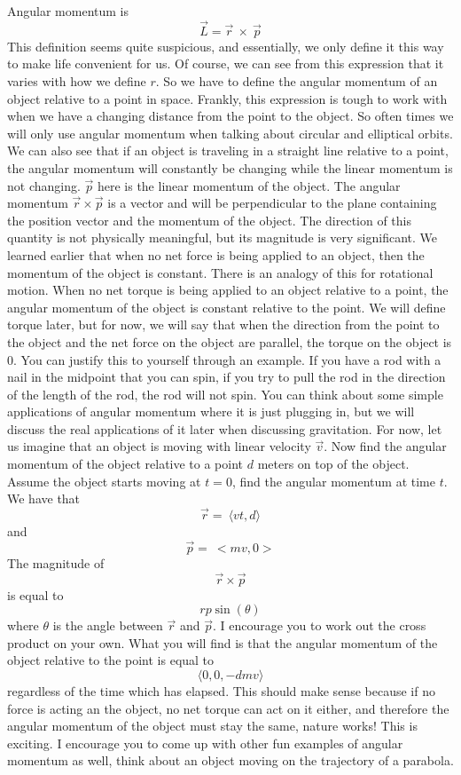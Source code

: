Angular momentum is \begin{equation}\vec{L} = \vec{r} \ \times \ \vec{p}\end{equation} This definition seems quite suspicious, and essentially, we only define it this way to make life convenient for us. Of course, we can see from this expression that it varies with how we define $r$. So we have to define the angular momentum of an object relative to a point in space. Frankly, this expression is tough to work with when we have a changing distance from the point to the object. So often times we will only use angular momentum when talking about circular and elliptical orbits. We can also see that if an object is traveling in a straight line relative to a point, the angular momentum will constantly be changing while the linear momentum is not changing. $\vec{p}$ here is the linear momentum of the object. The angular momentum $\vec{r} \times \vec{p}$ is a vector and will be perpendicular to the plane containing the position vector and the momentum of the object. The direction of this quantity is not physically meaningful, but its magnitude is very significant. We learned earlier that when no net force is being applied to an object, then the momentum of the object is constant. There is an analogy of this for rotational motion. When no net torque is being applied to an object relative to a point, the angular momentum of the object is constant relative to the point. We will define torque later, but for now, we will say that when the direction from the point to the object and the net force on the object are parallel, the torque on the object is 0. You can justify this to yourself through an example. If you have a rod with a nail in the midpoint that you can spin, if you try to pull the rod in the direction of the length of the rod, the rod will not spin. You can think about some simple applications of angular momentum where it is just plugging in, but we will discuss the real applications of it later when discussing gravitation. For now, let us imagine that an object is moving with linear velocity $\vec{v}$. Now find the angular momentum of the object relative to a point $d$ meters on top of the object. Assume the object starts moving at $t=0$, find the angular momentum at time $t$. We have that $$\vec{r}= \ \langle vt,d \rangle $$ and $$\vec{p}= \ <mv,0>$$ The magnitude of  $$\vec{r} \times \vec{p}$$ is equal to $$rp\sin\left(\theta \right)$$ where $\theta$ is the angle between $\vec{r}$ and $\vec{p}$. I encourage you to work out the cross product on your own. What you will find is that the angular momentum of the object relative to the point is equal to $$\langle 0,0,-dmv \rangle$$ regardless of the time which has elapsed. This should make sense because if no force is acting an the object, no net torque can act on it either, and therefore the angular momentum of the object must stay the same, nature works! This is exciting. I encourage you to come up with other fun examples of angular momentum as well, think about an object moving on the trajectory of a parabola. 